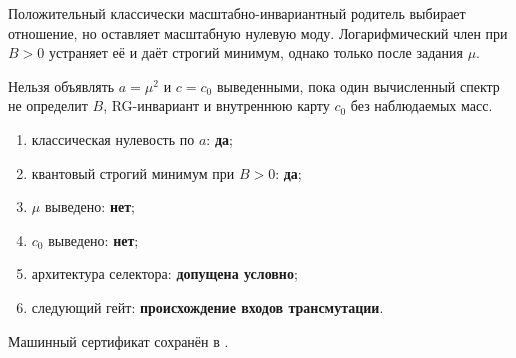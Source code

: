 \begin{theorem}
Положительный классически масштабно-инвариантный родитель выбирает отношение,
но оставляет масштабную нулевую моду. Логарифмический член при $B>0$
устраняет её и даёт строгий минимум, однако только после задания $\mu$.
\end{theorem}

\begin{nogocriterion}
Нельзя объявлять $a=\mu^2$ и $c=c_0$ выведенными, пока один вычисленный
спектр не определит $B$, RG-инвариант и внутреннюю карту $c_0$ без
наблюдаемых масс.
\end{nogocriterion}

\begin{protocol}\begin{enumerate}
\item классическая нулевость по $a$: \textbf{да};
\item квантовый строгий минимум при $B>0$: \textbf{да};
\item $\mu$ выведено: \textbf{нет};
\item $c_0$ выведено: \textbf{нет};
\item архитектура селектора: \textbf{допущена условно};
\item следующий гейт: \textbf{происхождение входов трансмутации}.
\end{enumerate}\end{protocol}

Машинный сертификат сохранён в
.